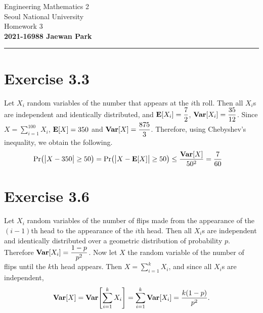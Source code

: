 \documentclass{article}
\begin{document}
\vspace*{-1.5cm}
{\centering \vbox{%
\vspace{2mm}
\large
Engineering Mathematics 2 \hfill
\\
Seoul National University
\\[4mm]
Homework 3\\
\textbf{2021-16988 Jaewan Park} \\[0.8mm]
}}
\par\noindent\rule{\textwidth}{0.5pt}

\section*{Exercise 3.3}
Let $X_i$ random variables of the number that appears at the $i$th roll. 
Then all $X_i$s are independent and identically distributed, and $\mathbf{E}\qty[X_i] = \dfrac{7}{2}$, $\mathbf{Var}\qty[X_i] = \dfrac{35}{12}$.
Since $X = \sum_{i=1}^{100}X_i$, $\mathbf{E}\qty[X] = 350$ and $\mathbf{Var}\qty[X] = \dfrac{875}{3}$.
Therefore, using Chebyshev’s inequality, we obtain the following.
\begin{align*}
  \mathrm{Pr}\qty(\big|X-350\big| \geq 50) = \mathrm{Pr}\qty(\big|X-\mathbf{E}\qty[X]\big| \geq 50) &\leq \frac{\mathbf{Var}\qty[X]}{50^2} = \frac{7}{60}
\end{align*}

\section*{Exercise 3.6}
Let $X_i$ random variables of the number of flips made from the appearance of the $(i-1)$th head to the appearance of the $i$th head.
Then all $X_i$s are independent and identically distributed over a geometric distribution of probability $p$.
Therefore $\mathbf{Var}\qty[X_i] = \dfrac{1-p}{p^2}$.
Now let $X$ the random variable of the number of flips until the $k$th head appears.
Then $X = \sum_{i=1}^{k}X_i$, and since all $X_i$s are independent, 
$$\mathbf{Var}\qty[X] = \mathbf{Var}\qty[\sum_{i=1}^{k}X_i] = \sum_{i=1}^{k}\mathbf{Var}\qty[X_i] = \frac{k(1-p)}{p^2}.$$
\end{document}
